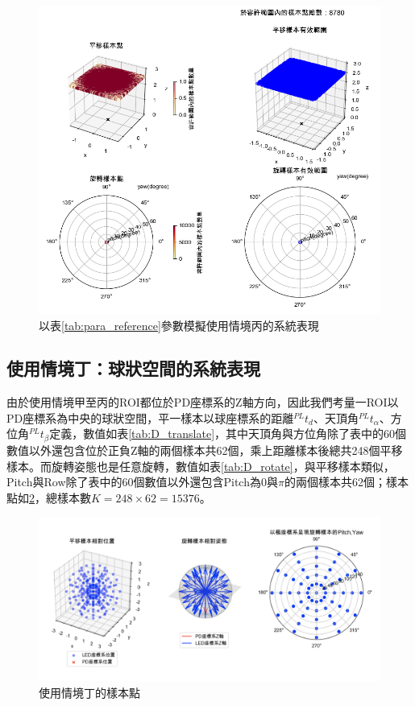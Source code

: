 \begin{figure}[htpb]
    \centering
    \includegraphics[width=15cm]{ch4pic/scene_c_solve.png}
    \caption{以表\ref{tab:para_reference}參數模擬使用情境丙的系統表現}
    \label{pic:scenario_c_solve}
\end{figure}


\subsection{使用情境丁：球狀空間的系統表現}
\label{chp:scene_D}


由於使用情境甲至丙的ROI都位於PD座標系的Z軸方向，因此我們考量一ROI以PD座標系為中央的球狀空間，平一樣本以球座標系的距離$^{PL}t_d$、天頂角$^{PL}t_{\alpha}$、方位角$^{PL}t_{\beta}$定義，數值如表\ref{tab:D_translate}，其中天頂角與方位角除了表中的60個數值以外還包含位於正負Z軸的兩個樣本共62個，乘上距離樣本後總共248個平移樣本。而旋轉姿態也是任意旋轉，數值如表\ref{tab:D_rotate}，與平移樣本類似，Pitch與Row除了表中的60個數值以外還包含Pitch為0與$\pi$的兩個樣本共62個；樣本點如\ref{pic:d_scenario}，總樣本數$K=248 \times 62 = 15376$。

\begin{figure}[htpb]
    \centering
    \includegraphics[width=15cm]{ch4pic/d_scenario.png}
    \caption{使用情境丁的樣本點}
    \label{pic:d_scenario}
\end{figure}

